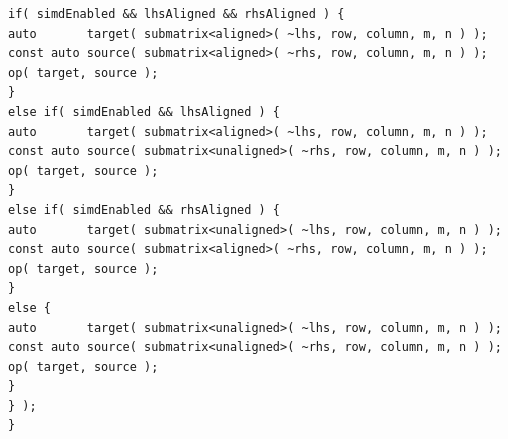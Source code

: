 \begin{lstlisting}[float,floatplacement=H,caption= {Previous implementation of Assign function for HPX backend in Blaze.}, label={old_hpx_backend}]
if( simdEnabled && lhsAligned && rhsAligned ) {
auto       target( submatrix<aligned>( ~lhs, row, column, m, n ) );
const auto source( submatrix<aligned>( ~rhs, row, column, m, n ) );
op( target, source );
}
else if( simdEnabled && lhsAligned ) {
auto       target( submatrix<aligned>( ~lhs, row, column, m, n ) );
const auto source( submatrix<unaligned>( ~rhs, row, column, m, n ) );
op( target, source );
}
else if( simdEnabled && rhsAligned ) {
auto       target( submatrix<unaligned>( ~lhs, row, column, m, n ) );
const auto source( submatrix<aligned>( ~rhs, row, column, m, n ) );
op( target, source );
}
else {
auto       target( submatrix<unaligned>( ~lhs, row, column, m, n ) );
const auto source( submatrix<unaligned>( ~rhs, row, column, m, n ) );
op( target, source );
}
} );
}
\end{lstlisting}

